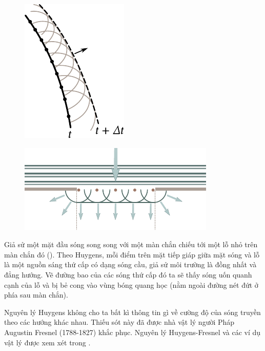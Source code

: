 \begin{figure}[!htb]
	\begin{minipage}[t]{0.41\linewidth}
		\begin{center}
			\includegraphics[scale=1]{figures/ch_16/fig_16_21.pdf}
			\caption[]{}
			\label{fig:16_21}
		\end{center}
	\end{minipage}
	\hfill{ }%
	\begin{minipage}[t]{0.55\linewidth}
		\begin{center}
			\includegraphics[scale=1]{figures/ch_16/fig_16_22.pdf}
            \caption[]{}
			\label{fig:16_22}
		\end{center}
	\end{minipage}
\vspace{-0.4cm}
\end{figure}

Giả sử một mặt đầu sóng song song với một màn chắn chiếu tới một lỗ nhỏ trên màn chắn đó ().
Theo Huygens, mỗi điểm trên mặt tiếp giáp giữa mặt sóng và lỗ là một nguồn sáng thứ cấp có dạng sóng cầu, giả sử môi trường là đồng nhất và đẳng hướng. Vẽ đường bao của các sóng thứ cấp đó ta sẽ thấy sóng uốn quanh cạnh của lỗ và bị bẻ cong vào vùng bóng quang học (nằm ngoài đường nét đứt ở phía sau màn chắn).

Nguyên lý Huygens không cho ta bất kì thông tin gì về cường độ của sóng truyền theo các hướng khác nhau.
Thiếu sót này đã được nhà vật lý người Pháp Augustin Fresnel (1788-1827) khắc phục.
Nguyên lý Huygens-Fresnel và các ví dụ vật lý được xem xét trong .
